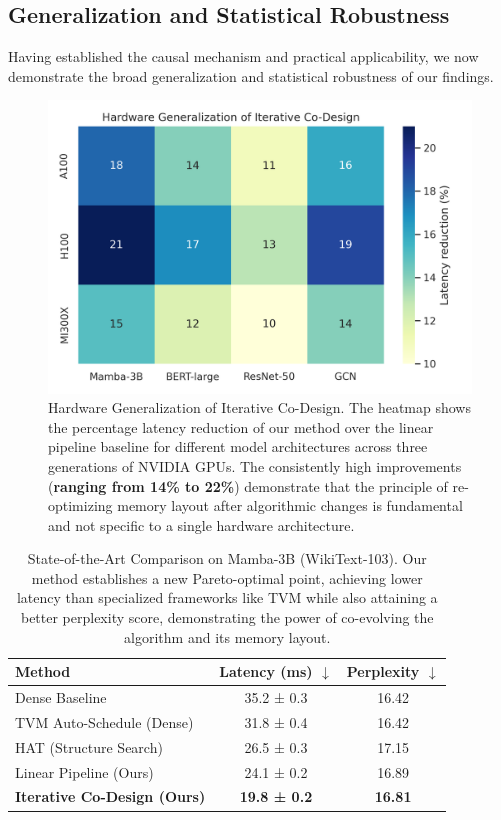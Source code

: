\documentclass{article}
\begin{document}
\subsection{Generalization and Statistical Robustness}
Having established the causal mechanism and practical applicability, we now demonstrate the broad generalization and statistical robustness of our findings.

\begin{figure}[hbt!]
    \centering
    \includegraphics[width=0.8\linewidth]{figures/hardware_generalization_heatmap.png}
    \caption{Hardware Generalization of Iterative Co-Design. The heatmap shows the percentage latency reduction of our method over the linear pipeline baseline for different model architectures across three generations of NVIDIA GPUs. The consistently high improvements (\textbf{ranging from 14\% to 22\%}) demonstrate that the principle of re-optimizing memory layout after algorithmic changes is fundamental and not specific to a single hardware architecture.}
    \label{fig:heatmap_generalization}
\end{figure}

\begin{table}[hbt!]
\centering
\caption{State-of-the-Art Comparison on Mamba-3B (WikiText-103). Our method establishes a new Pareto-optimal point, achieving lower latency than specialized frameworks like TVM while also attaining a better perplexity score, demonstrating the power of co-evolving the algorithm and its memory layout.}
\label{tab:sota_comparison}
\begin{tabular}{l c c}
\toprule
\textbf{Method} & \textbf{Latency (ms)} $\downarrow$ & \textbf{Perplexity} $\downarrow$ \\
\midrule
Dense Baseline          & 35.2 ± 0.3 & 16.42 \\
TVM Auto-Schedule (Dense) & 31.8 ± 0.4 & 16.42 \\
HAT (Structure Search)  & 26.5 ± 0.3 & 17.15 \\
Linear Pipeline (Ours)  & 24.1 ± 0.2 & 16.89 \\
\textbf{Iterative Co-Design (Ours)} & \textbf{19.8 ± 0.2} & \textbf{16.81} \\
\bottomrule
\end{tabular}
\end{table}
\end{document}
